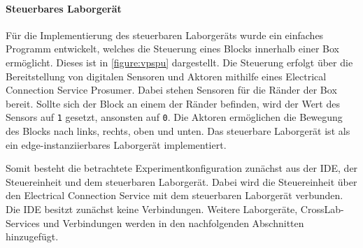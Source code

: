 \paragraph{Steuerbares Laborgerät}
Für die Implementierung des steuerbaren Laborgeräts wurde ein einfaches Programm entwickelt, welches die Steuerung eines Blocks innerhalb einer Box ermöglicht. Dieses ist in \autoref{figure:vpspu} dargestellt. Die Steuerung erfolgt über die Bereitstellung von digitalen Sensoren und Aktoren mithilfe eines Electrical Connection Service Prosumer. Dabei stehen Sensoren für die Ränder der Box bereit. Sollte sich der Block an einem der Ränder befinden, wird der Wert des Sensors auf \texttt{1} gesetzt, ansonsten auf \texttt{0}. Die Aktoren ermöglichen die Bewegung des Blocks nach links, rechts, oben und unten. Das steuerbare Laborgerät ist als ein edge-instanziierbares Laborgerät implementiert.

Somit besteht die betrachtete Experimentkonfiguration zunächst aus der IDE, der Steuereinheit und dem steuerbaren Laborgerät. Dabei wird die Steuereinheit über den Electrical Connection Service mit dem steuerbaren Laborgerät verbunden. Die IDE besitzt zunächst keine Verbindungen. Weitere Laborgeräte, CrossLab-Services und Verbindungen werden in den nachfolgenden Abschnitten hinzugefügt.